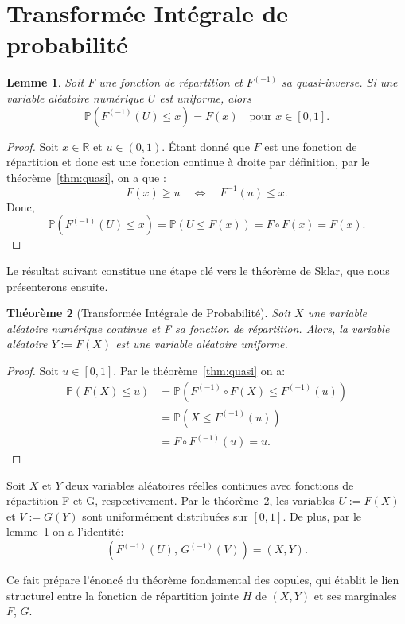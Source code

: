 \documentclass[a4paper,11pt]{amsbook}
\numberwithin{equation}{chapter}
\newtheorem{theoreme}			     {Théorème}	[chapter]
\newtheorem{lemme}	    [theoreme]	 {Lemme}
\theoremstyle{definition}
\begin{document}
\section{Transformée Intégrale de probabilité}
\begin{lemme}\label{lemme:echantillon}
Soit \( F \) une fonction de répartition et \( F^{(-1)} \) sa quasi-inverse. 
Si une variable aléatoire numérique \(U\) est uniforme, alors
\[
\mathbb{P}(F^{(-1)}(U) \leq x) = F(x) \quad \text{pour } x \in [0,1].
\]
\end{lemme}

\begin{proof}
Soit \( x \in \mathbb{R} \) et \( u \in (0,1) \).  
Étant donné que \( F \) est une fonction de répartition et donc est une fonction continue à droite par définition,  
par le théorème~\ref{thm:quasi}, on a que :
\[
F(x) \geq u \quad \Longleftrightarrow \quad F^{-1}(u) \leq x.
\]
Donc,
\[
\mathbb{P}(F^{(-1)}(U) \leq x) = \mathbb{P}(U \leq F(x)) = F \circ F(x) = F(x).
\]
\end{proof}

Le résultat suivant constitue une étape clé vers le théorème de Sklar, que nous présenterons ensuite.
\begin{theoreme}[Transformée Intégrale de Probabilité]\label{thm:PIT}
Soit \( X \) une variable aléatoire numérique continue et F sa fonction de répartition. Alors, la variable aléatoire \( Y := F(X)\) est une variable aléatoire uniforme.
\end{theoreme}

\begin{proof}
Soit \( u \in [0,1] \). Par le théorème~\ref{thm:quasi} on a:
\begin{align*}
\mathbb{P}(F(X) \leq u) 
&= \mathbb{P}(F^{(-1)} \circ F(X) \leq F^{(-1)}(u)) \\
&= \mathbb{P}(X \leq F^{(-1)}(u)) \\
&= F \circ F^{(-1)}(u) = u.
\end{align*}
\end{proof}

Soit \( X \) et \( Y \) deux variables aléatoires réelles continues avec fonctions de répartition F et G, respectivement. Par le théorème~\ref{thm:PIT}, les variables \( U := F(X) \) et \( V := G(Y) \) sont uniformément distribuées sur \( [0,1] \). De plus, par le lemme~\ref{lemme:echantillon} on a l'identité:
\[
(F^{(-1)}(U),\, G^{(-1)}(V)) = (X, Y).
\]

Ce fait prépare l’énoncé du théorème fondamental des copules, qui établit le lien structurel entre la fonction de répartition jointe \( H \) de \( (X,Y) \) et ses marginales \( F \), \( G \).
\end{document}
